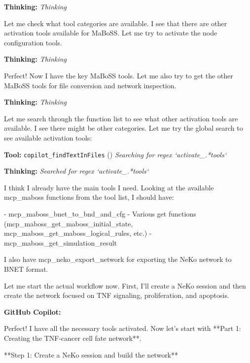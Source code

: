 \documentclass[11pt,a4paper]{article}
\begin{document}
\begin{thinkbox}
\textbf{Thinking:} \textit{Thinking}

Let me check what tool categories are available. I see that there are other activation tools available for MaBoSS. Let me try to activate the node configuration tools.

\end{thinkbox}
\begin{thinkbox}
\textbf{Thinking:} \textit{Thinking}

Perfect! Now I have the key MaBoSS tools. Let me also try to get the other MaBoSS tools for file conversion and network inspection.

\end{thinkbox}
\begin{thinkbox}
\textbf{Thinking:} \textit{Thinking}

Let me search through the function list to see what other activation tools are available. I see there might be other categories. Let me try the global search to see available activation tools:

\end{thinkbox}
\begin{toolokbox}
\textbf{Tool:} \texttt{copilot\_findTextInFiles} (\checkmark)
\textit{Searching for regex `activate\_.*tools`}
\end{toolokbox}
\begin{thinkbox}
\textbf{Thinking:} \textit{Searched for regex `activate\_.*tools`}

I think I already have the main tools I need. Looking at the available mcp\_maboss functions from the tool list, I should have:

- mcp\_maboss\_bnet\_to\_bnd\_and\_cfg
- Various get functions (mcp\_maboss\_get\_maboss\_initial\_state, mcp\_maboss\_get\_maboss\_logical\_rules, etc.)
- mcp\_maboss\_get\_simulation\_result

I also have mcp\_neko\_export\_network for exporting the NeKo network to BNET format.

Let me start the actual workflow now. First, I'll create a NeKo session and then create the network focused on TNF signaling, proliferation, and apoptosis.

\end{thinkbox}
\begin{copilotbox}
\textbf{GitHub Copilot:}

Perfect! I have all the necessary tools activated. Now let's start with **Part 1: Creating the TNF-cancer cell fate network**.

**Step 1: Create a NeKo session and build the network**

\end{copilotbox}
\end{document}
